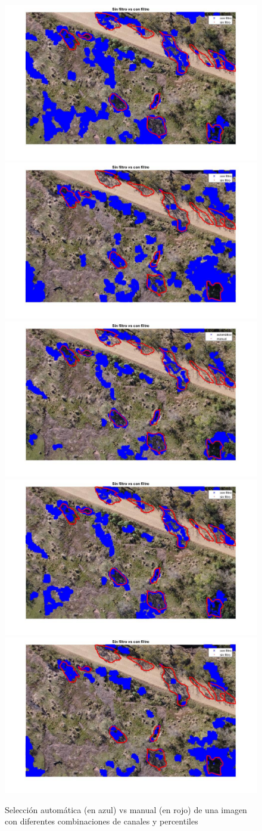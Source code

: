 \begin{figure}
    \includegraphics[width=.3\textwidth]{Imagenes/IIC/p85/BG/350a.jpg}\hfill
    \includegraphics[width=.3\textwidth]{Imagenes/IIC/p85/GR/350a.jpg}\hfill
    \\[\smallskipamount]
    \includegraphics[width=.3\textwidth]{Imagenes/IIC/p90/BR/350a.jpg}\hfill
    \includegraphics[width=.3\textwidth]{Imagenes/IIC/p90/BG/350a.jpg}\hfill
    \includegraphics[width=.3\textwidth]{Imagenes/IIC/p90/GR/350a.jpg}\hfill
    
    \caption{Selección automática (en azul) vs manual (en rojo) de una imagen con diferentes combinaciones de canales y percentiles}
\end{figure}\label{dji350}

